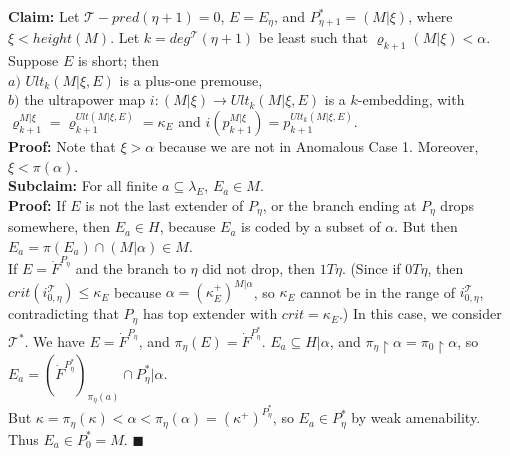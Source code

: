 \documentclass[12pt]{article}
\begin{document}
\textbf{Claim:} Let $\mathscr{T}-pred (\eta + 1 )= 0$, $E = E_\eta$, and $P_{\eta + 1}^* = ( M | \xi )$, where $\xi < height(M)$.  Let $k = deg^{\mathscr{T}} (\eta + 1)$ be least such that $\varrho_{k + 1} (M | \xi ) < \alpha$.  Suppose $E$ is short; then\\

\indent $a)$ $Ult_k (M | \xi , E )$ is a plus-one premouse,\\

\indent $b)$ the ultrapower map $i: (M | \xi ) \longrightarrow Ult_k (M | \xi , E )$ is a $k$-embedding, with $\varrho_{k + 1}^{M | \xi} = \varrho_{k + 1}^{Ult ( M | \xi , E )} = \kappa_E$ and $i(p_{k + 1}^{M | \xi} ) = p_{k + 1}^{Ult_k (M | \xi , E )}$.\\



\indent \indent \textbf{Proof:}  Note that $\xi > \alpha$ because we are not in Anomalous Case 1.  Moreover, $\xi < \pi (\alpha)$.\\

\textbf{Subclaim:} For all finite $a \subseteq \lambda_E$, $E_a \in M$.\\

\indent \indent \textbf{Proof:} If $E$ is not the last extender of $P_\eta$, or the branch ending at $P_\eta$ drops somewhere, then $E_a \in H$, because $E_a$ is coded by a subset of $\alpha$.  But then $E_a = \pi (E_a) \cap (M | \alpha) \in M$.\\

If $E = \dot{F}^{P_\eta}$ and the branch to $\eta$ did not drop, then $1T \eta$.  (Since if $0T \eta$, then $crit( i^{\mathscr{T}}_{0, \eta}) \leq \kappa_E$ because $\alpha = (\kappa_E^{+})^{M | \alpha}$, so $\kappa_E$ cannot be in the range of $i^{\mathscr{T}}_{0, \eta}$, contradicting that $P_\eta$ has top extender with $crit = \kappa_E$.)  In this case, we consider $\mathscr{T}^*$.  We have $E = \dot{F}^{P_\eta}$, and $\pi_\eta (E) = \dot{F}^{P_\eta^*}$.  $E_a \subseteq H | \alpha$, and $\pi_\eta \restriction \alpha = \pi_0 \restriction \alpha$, so\\

\indent \indent $E_a = ( \dot{F}^{P_\eta^*})_{\pi_\eta (a)} \cap P_\eta^* | \alpha$.\\

But $\kappa = \pi_\eta (\kappa) < \alpha < \pi_\eta (\alpha) = (\kappa^+)^{P_\eta^*}$, so $E_a \in P_\eta^*$ by weak amenability.  Thus $E_a \in P_0^* = M$. $\blacksquare$\\
\end{document}
